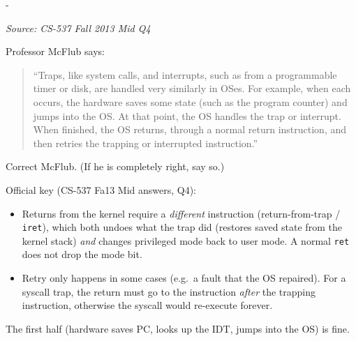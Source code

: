 \documentclass[11pt,a4paper]{article}
\makeatletter
\newcommand{\keepspace}[1]{\par\penalty-100\begingroup
  \setlength{\dimen@}{#1}\dimen@ii\pagegoal\advance\dimen@ii-\pagetotal
  \ifdim\dimen@>\dimen@ii\ifdim\dimen@ii>\z@\vfil\fi\break\fi\endgroup}
\newcounter{qn}[section]
\newenvironment{Qn}[4]{%
  \refstepcounter{qn}\keepspace{7\baselineskip}%
  \begin{tcolorbox}[qboxstyle, title={Q\thesection.\theqn\ \ [#1 \textbar\ #2]\ \ #4}]%
  {\footnotesize\color{g3}\textit{Source: #3}}\par\smallskip%
}{%
  \end{tcolorbox}%
}
\newenvironment{Sol}{%
  \begin{tcolorbox}[sboxstyle, title={Solution}]%
}{%
  \end{tcolorbox}\vspace{0.35em}%
}
\makeatother
\begin{document}
\begin{Qn}{Hard}{Lect 4}{CS-537 Fall 2013 Mid Q4}{McFlub on traps and interrupts}
Professor McFlub says:
\begin{quote}
``Traps, like system calls, and interrupts, such as from a programmable timer or disk, are handled very similarly in OSes. For example, when each occurs, the hardware saves some state (such as the program counter) and jumps into the OS. At that point, the OS handles the trap or interrupt. When finished, the OS returns, through a normal return instruction, and then retries the trapping or interrupted instruction.''
\end{quote}
Correct McFlub. (If he is completely right, say so.)
\end{Qn}
\begin{Sol}
Official key (CS-537 Fa13 Mid answers, Q4):
\begin{itemize}
  \item Returns from the kernel require a \emph{different} instruction (return-from-trap / \texttt{iret}), which both undoes what the trap did (restores saved state from the kernel stack) \emph{and} changes privileged mode back to user mode. A normal \texttt{ret} does not drop the mode bit.
  \item Retry only happens in some cases (e.g.\ a fault that the OS repaired). For a syscall trap, the return must go to the instruction \emph{after} the trapping instruction, otherwise the syscall would re-execute forever.
\end{itemize}
The first half (hardware saves PC, looks up the IDT, jumps into the OS) is fine.
\end{Sol}
\end{document}
